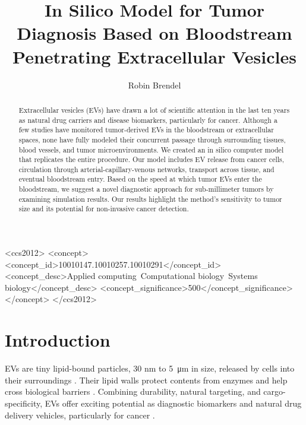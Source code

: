 \documentclass[sigconf]{acmart}
\begin{document}
\title{In Silico Model for Tumor Diagnosis Based on Bloodstream Penetrating Extracellular Vesicles}
\author{Robin Brendel}

\begin{abstract}
Extracellular vesicles (EVs) have drawn a lot of scientific attention in the last ten years as natural drug carriers and disease biomarkers, particularly for cancer. Although a few studies have monitored tumor-derived EVs in the bloodstream or extracellular spaces, none have fully modeled their concurrent passage through surrounding tissues, blood vessels, and tumor microenvironments. We created an in silico computer model that replicates the entire procedure. Our model includes EV release from cancer cells, circulation through arterial-capillary-venous networks, transport across tissue, and eventual bloodstream entry. Based on the speed at which tumor EVs enter the bloodstream, we suggest a novel diagnostic approach for sub-millimeter tumors by examining simulation results. Our results highlight the method's sensitivity to tumor size and its potential for non-invasive cancer detection. 
\end{abstract}

\begin{CCSXML}
<ccs2012>
 <concept>
  <concept_id>10010147.10010257.10010291</concept_id>
  <concept_desc>Applied computing~Computational biology~Systems biology</concept_desc>
  <concept_significance>500</concept_significance>
 </concept>
</ccs2012>
\end{CCSXML}



\maketitle

\section{Introduction}
\label{sec: introduction}
EVs are tiny lipid-bound particles, 30 nm to \SI{5}{\micro\meter} in size, released by cells into their surroundings \cite{Doyle_2019}. Their lipid walls protect contents from enzymes and help cross biological barriers \cite{Arjmandi_2021}. Combining durability, natural targeting, and cargo-specificity, EVs offer exciting potential as diagnostic biomarkers and natural drug delivery vehicles, particularly for cancer \cite{Doyle_2019}.
\end{document}
